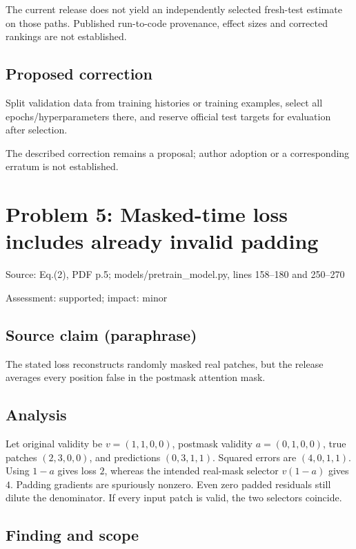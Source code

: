 \documentclass[11pt]{article}
\begin{document}
The current release does not yield an independently selected fresh-test estimate on those paths. Published run-to-code provenance, effect sizes and corrected rankings are not established.

\subsection*{Proposed correction}

Split validation data from training histories or training examples, select all epochs/hyperparameters there, and reserve official test targets for evaluation after selection.

The described correction remains a proposal; author adoption or a corresponding erratum is not established.

\section*{Problem 5: Masked-time loss includes already invalid padding}

Source: Eq.(2), PDF p.5; models/pretrain\_model.py, lines 158–180 and 250–270

Assessment: supported; impact: minor

\subsection*{Source claim (paraphrase)}

The stated loss reconstructs randomly masked real patches, but the release averages every position false in the postmask attention mask.

\subsection*{Analysis}

Let original validity be \(v=(1,1,0,0)\), postmask validity \(a=(0,1,0,0)\), true patches \((2,3,0,0)\), and predictions \((0,3,1,1)\). Squared errors are \((4,0,1,1)\). Using \(1-a\) gives loss \(2\), whereas the intended real-mask selector \(v(1-a)\) gives \(4\). Padding gradients are spuriously nonzero. Even zero padded residuals still dilute the denominator. If every input patch is valid, the two selectors coincide.

\subsection*{Finding and scope}
\end{document}
